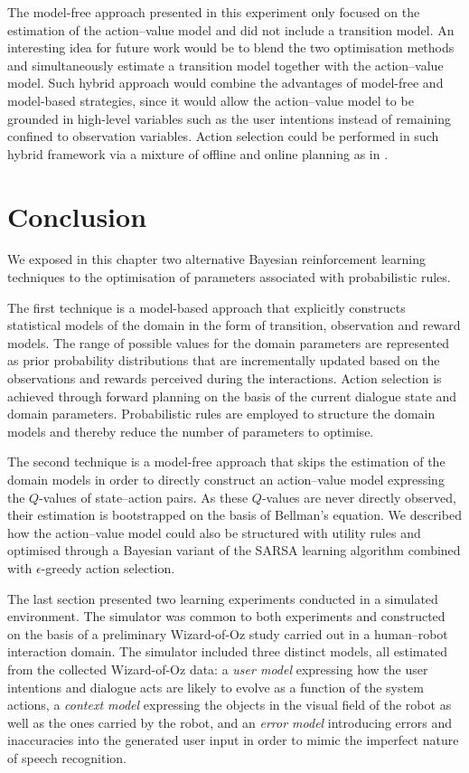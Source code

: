 The model-free approach presented in this experiment only focused on the estimation of the action--value model and did not include a transition model.  An interesting idea for future work would be to blend the two optimisation methods and simultaneously estimate a transition model together with the action--value model.  Such hybrid approach would combine the advantages of model-free and model-based strategies, since it would allow the action--value model to be grounded in high-level variables such as the user intentions instead of remaining confined to observation variables. Action selection could be performed in such hybrid framework via a mixture of offline and online planning as in \cite{RossC07}. 

\section{Conclusion}


We exposed in this chapter two alternative Bayesian reinforcement learning techniques to the optimisation of parameters associated with probabilistic rules.

The first technique is a model-based approach that explicitly constructs statistical models of the domain in the form of transition, observation and reward models.  The range of possible values for the domain parameters are represented as prior probability distributions that are incrementally updated based on the observations and rewards perceived during the interactions. Action selection is achieved through forward planning on the basis of the current dialogue state and domain parameters. Probabilistic rules are employed to structure the domain models and thereby reduce the number of parameters to optimise. 

The second technique is a model-free approach that skips the estimation of the domain models in order to directly construct an action--value model expressing the $Q$-values of state--action pairs.  As these $Q$-values are never directly observed, their estimation is bootstrapped on the basis of Bellman's equation. We described how the action--value model could also be structured with utility rules and optimised through a Bayesian variant of the SARSA learning algorithm combined with $\epsilon$-greedy action selection. 

The last section presented two learning experiments conducted in a simulated environment.  The simulator was common to both experiments and constructed on the basis of a preliminary Wizard-of-Oz study carried out in a human--robot interaction domain. The simulator included three distinct models, all estimated from the collected Wizard-of-Oz data: a \textit{user model} expressing how the user intentions and dialogue acts are likely to evolve as a function of the system actions, a \textit{context model} expressing the objects in the visual field of the robot as well as the ones carried by the robot, and an \textit{error model} introducing errors and inaccuracies into the generated user input in order to mimic the imperfect nature of speech recognition.


